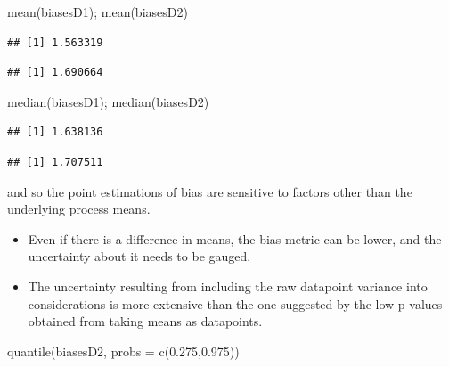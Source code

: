 \documentclass[
  10pt,
  dvipsnames,enabledeprecatedfontcommands]{scrartcl}
\newenvironment{Shaded}{\begin{snugshade}}{\end{snugshade}}
\newcommand{\AttributeTok}[1]{\textcolor[rgb]{0.77,0.63,0.00}{#1}}
\newcommand{\FloatTok}[1]{\textcolor[rgb]{0.00,0.00,0.81}{#1}}
\newcommand{\FunctionTok}[1]{\textcolor[rgb]{0.00,0.00,0.00}{#1}}
\newcommand{\NormalTok}[1]{#1}
\begin{document}
\vspace{1mm}
\footnotesize

\begin{Shaded}
\begin{Highlighting}[]
\FunctionTok{mean}\NormalTok{(biasesD1); }\FunctionTok{mean}\NormalTok{(biasesD2)}
\end{Highlighting}
\end{Shaded}

\begin{verbatim}
## [1] 1.563319
\end{verbatim}

\begin{verbatim}
## [1] 1.690664
\end{verbatim}

\begin{Shaded}
\begin{Highlighting}[]
\FunctionTok{median}\NormalTok{(biasesD1); }\FunctionTok{median}\NormalTok{(biasesD2)}
\end{Highlighting}
\end{Shaded}

\begin{verbatim}
## [1] 1.638136
\end{verbatim}

\begin{verbatim}
## [1] 1.707511
\end{verbatim}

\normalsize

and so the point estimations of bias are sensitive to factors other than
the underlying process means.

\begin{itemize}
\item
  Even if there is a difference in means, the bias metric can be lower,
  and the uncertainty about it needs to be gauged.
\item
  The uncertainty resulting from including the raw datapoint variance
  into considerations is more extensive than the one suggested by the
  low p-values obtained from taking means as datapoints.
\end{itemize}

\vspace{1mm}
\footnotesize

\begin{Shaded}
\begin{Highlighting}[]
\FunctionTok{quantile}\NormalTok{(biasesD2, }\AttributeTok{probs =} \FunctionTok{c}\NormalTok{(}\FloatTok{0.275}\NormalTok{,}\FloatTok{0.975}\NormalTok{))}
\end{Highlighting}
\end{Shaded}
\end{document}
